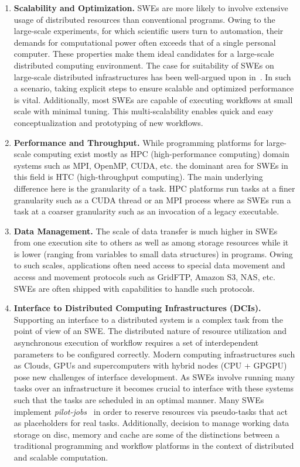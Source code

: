 \begin{enumerate}
%
\item \textbf{Scalability and Optimization.} SWEs are more likely to involve
extensive usage of distributed resources than conventional programs. Owing
to the large-scale experiments, for which scientific users turn to automation,
their demands for computational power often exceeds that of a single personal
computer. These properties make them ideal candidates for a large-scale
distributed computing environment. The case for suitability of SWEs on
large-scale distributed infrastructures has been well-argued upon
in~\cite{jha-katz-etal:2009}. In such a scenario, taking explicit steps to
ensure scalable and optimized performance is vital. Additionally, most SWEs are
capable of executing workflows at small scale with minimal tuning. This
multi-scalability enables quick and easy conceptualization and prototyping of
new workflows.
%

\item \textbf{Performance and Throughput.} While programming platforms for
large-scale computing exist mostly as HPC (high-performance computing)
domain systems such as MPI, OpenMP, CUDA, etc. the dominant area for SWEs in
this field is HTC (high-throughput computing). The main underlying difference
here is the granularity of a task. HPC platforms run tasks at a finer
granularity such as a CUDA thread or an MPI process where as SWEs run a task at
a coarser granularity such as an invocation of a legacy executable.

\item \textbf{Data Management.} The scale of data transfer is much higher in
SWEs from one execution site to others as well as among storage resources while
it is lower (ranging from variables to small data structures) in programs.
Owing to such scales, applications often need access to special data movement
and access and movement protocols such as GridFTP, Amazon S3, NAS, etc. SWEs are often
shipped with capabilities to handle such protocols.
%

\item \textbf{Interface to Distributed Computing Infrastructures (DCIs).}
Supporting an interface to a distributed system is a complex task from the
point of view of an SWE. The distributed nature of resource utilization and
asynchronous execution of workflow requires a set of interdependent parameters
to be configured correctly. Modern computing infrastructures such as Clouds,
GPUs and supercomputers with hybrid nodes (CPU + GPGPU) pose new challenges of
interface development.  As SWEs involve running many tasks over an
infrastructure it becomes crucial to interface with these systems such that the
tasks are scheduled in an optimal manner. Many SWEs implement
\emph{pilot-jobs}~\cite{montagnat-glatard-etal:2010,ucc2011} in order to
reserve resources via pseudo-tasks that act as placeholders for real tasks.
Additionally, decision to manage working data storage on disc, memory and cache
are some of the distinctions between a traditional programming and workflow
platforms in the context of distributed and scalable computation.


\end{enumerate}
